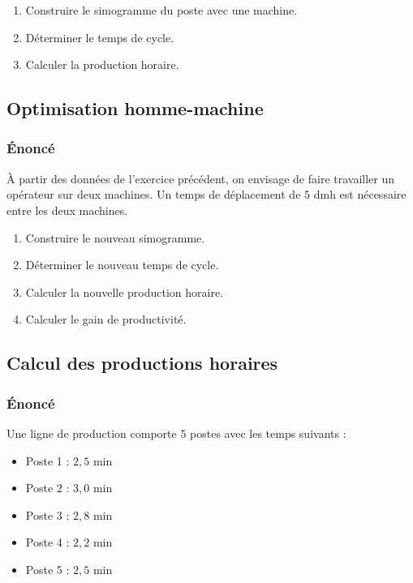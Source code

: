 \documentclass[a4paper,12pt]{article}
\begin{document}
\begin{enumerate}
    \item Construire le simogramme du poste avec une machine.
    \item Déterminer le temps de cycle.
    \item Calculer la production horaire.
\end{enumerate}

\subsection{Optimisation homme-machine}

\subsubsection*{Énoncé}

À partir des données de l'exercice précédent, on envisage de faire travailler un opérateur sur deux machines. Un temps de déplacement de $5$ dmh est nécessaire entre les deux machines.

\begin{enumerate}
    \item Construire le nouveau simogramme.
    \item Déterminer le nouveau temps de cycle.
    \item Calculer la nouvelle production horaire.
    \item Calculer le gain de productivité.
\end{enumerate}

\subsection{Calcul des productions horaires}

\subsubsection*{Énoncé}

Une ligne de production comporte $5$ postes avec les temps suivants :

\begin{itemize}
    \item Poste 1 : $2,5$ min
    \item Poste 2 : $3,0$ min
    \item Poste 3 : $2,8$ min
    \item Poste 4 : $2,2$ min
    \item Poste 5 : $2,5$ min
\end{itemize}
\end{document}
